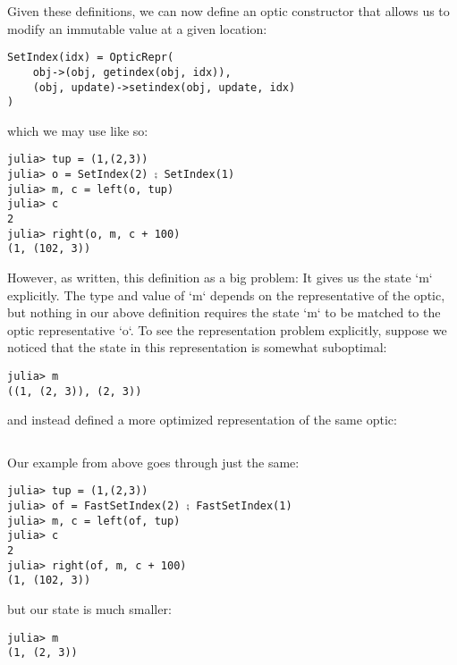\documentclass[letterpaper, 10 pt, conference]{ieeeconf}  %
\begin{document}
\inputminted[frame=lines,framesep=2mm,fontsize=\footnotesize, xleftmargin=0.5em, mathescape, linenos]{julia}{opticdef.jl}

Given these definitions, we can now define an optic constructor that allows us
to modify an immutable value at a given location:

\begin{verbatim}
SetIndex(idx) = OpticRepr(
    obj->(obj, getindex(obj, idx)),
    (obj, update)->setindex(obj, update, idx)
)
\end{verbatim}

which we may use like so:

\begin{verbatim}
julia> tup = (1,(2,3))
julia> o = SetIndex(2) ⨟ SetIndex(1)
julia> m, c = left(o, tup)
julia> c
2
julia> right(o, m, c + 100)
(1, (102, 3))
\end{verbatim}

However, as written, this definition as a big problem: It gives us the state `m`
explicitly. The type and value of `m` depends on the representative of the optic,
but nothing in our above definition requires the state `m` to be matched to the
optic representative `o`. To see the representation problem explicitly, suppose
we noticed that the state in this representation is somewhat suboptimal:

\begin{verbatim}
julia> m
((1, (2, 3)), (2, 3))
\end{verbatim}

and instead defined a more optimized representation of the same optic:

\inputminted[frame=lines,framesep=2mm,fontsize=\footnotesize, xleftmargin=0.5em, mathescape, linenos]{julia}{fastsetindex.jl}

Our example from above goes through just the same:

\begin{verbatim}
julia> tup = (1,(2,3))
julia> of = FastSetIndex(2) ⨟ FastSetIndex(1)
julia> m, c = left(of, tup)
julia> c
2
julia> right(of, m, c + 100)
(1, (102, 3))
\end{verbatim}

but our state is much smaller:

\begin{verbatim}
julia> m
(1, (2, 3))
\end{verbatim}
\end{document}
